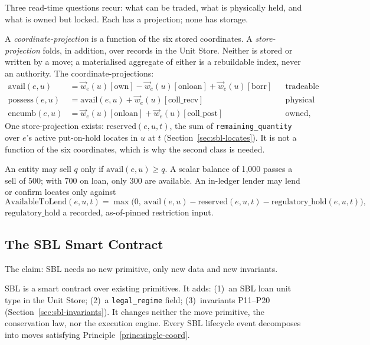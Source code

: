 Three read-time questions recur: what can be traded, what is physically held, and what is owned but locked. Each has a projection; none has storage.

\begin{definition}[Projections]
\label{def:projections}
A \emph{coordinate-projection} is a function of the six stored coordinates. A \emph{store-projection} folds, in addition, over records in the Unit Store. Neither is stored or written by a move; a materialised aggregate of either is a rebuildable index, never an authority. The coordinate-projections:
\begin{align*}
\mathrm{avail}(e,u)   &= \vec{w}_e(u)[\mathrm{own}] - \vec{w}_e(u)[\mathrm{onloan}] + \vec{w}_e(u)[\mathrm{borr}] && \text{tradeable inventory}\\
\mathrm{possess}(e,u) &= \mathrm{avail}(e,u) + \vec{w}_e(u)[\mathrm{coll\_recv}] && \text{physical custody}\\
\mathrm{encumb}(e,u)  &= \vec{w}_e(u)[\mathrm{onloan}] + \vec{w}_e(u)[\mathrm{coll\_post}] && \text{owned, not tradeable}
\end{align*}
One store-projection exists: $\mathrm{reserved}(e,u,t)$, the sum of \texttt{remaining\_quantity} over $e$'s active put-on-hold locates in $u$ at $t$ (Section~\ref{sec:sbl-locates}). It is not a function of the six coordinates, which is why the second class is needed.
\end{definition}

\noindent An entity may sell $q$ only if $\mathrm{avail}(e,u) \geq q$. A scalar balance of 1{,}000 passes a sell of 500; with 700 on loan, only 300 are available. An in-ledger lender may lend or confirm locates only against
\[
\text{AvailableToLend}(e,u,t) = \max\bigl(0,\ \mathrm{avail}(e,u) - \mathrm{reserved}(e,u,t) - \mathrm{regulatory\_hold}(e,u,t)\bigr),
\]
$\mathrm{regulatory\_hold}$ a recorded, as-of-pinned restriction input.

\subsection{The SBL Smart Contract}
\label{sec:sbl-contract}

The claim: SBL needs no new primitive, only new data and new invariants.

\begin{principle}
\label{princ:sbl-representable}
SBL is a smart contract over existing primitives. It adds: (1)~an SBL loan unit type in the Unit Store; (2)~a \texttt{legal\_regime} field; (3)~invariants P11--P20 (Section~\ref{sec:sbl-invariants}). It changes neither the move primitive, the conservation law, nor the execution engine. Every SBL lifecycle event decomposes into moves satisfying Principle~\ref{princ:single-coord}.
\end{principle}

